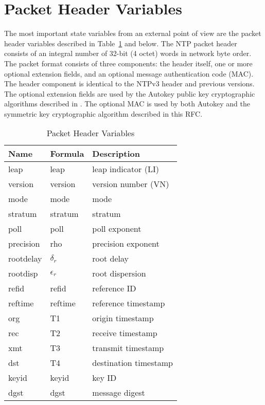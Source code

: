 \section{Packet Header Variables}
\label{section-7-3}

The most important state variables from an external point of view are
the packet header variables described in Table~\ref{packet_header_variables} and below. The NTP
packet header consists of an integral number of 32-bit (4 octet)
words in network byte order. The packet format consists of three
components: the header itself, one or more optional extension fields,
and an optional message authentication code (MAC). The header
component is identical to the NTPv3 header and previous versions.
The optional extension fields are used by the Autokey public key
cryptographic algorithms described in \cite{RFC5906}. The optional MAC is
used by both Autokey and the symmetric key cryptographic algorithm
described in this RFC.

\begin{table}[htb]
  \center
  \begin{tabular}{| l | l | l |}
    \hline
    Name & Formula & Description \\
    \hline
    \hline
    leap & leap & leap indicator (LI) \\
    version & version & version number (VN) \\
    mode & mode & mode \\
    stratum & stratum & stratum \\
    poll & poll & poll exponent \\
    precision & rho & precision exponent \\
    rootdelay & $ \delta_r $ & root delay \\
    rootdisp & $ \epsilon_r $ & root dispersion \\
    refid & refid & reference ID \\
    reftime & reftime & reference timestamp \\
    org & T1 & origin timestamp \\
    rec & T2 & receive timestamp \\
    xmt & T3 & transmit timestamp \\
    dst & T4 & destination timestamp \\
    keyid & keyid & key ID \\
    dgst & dgst & message digest \\
    \hline
  \end{tabular}
  \caption{Packet Header Variables}
  \label{packet_header_variables}
\end{table}

